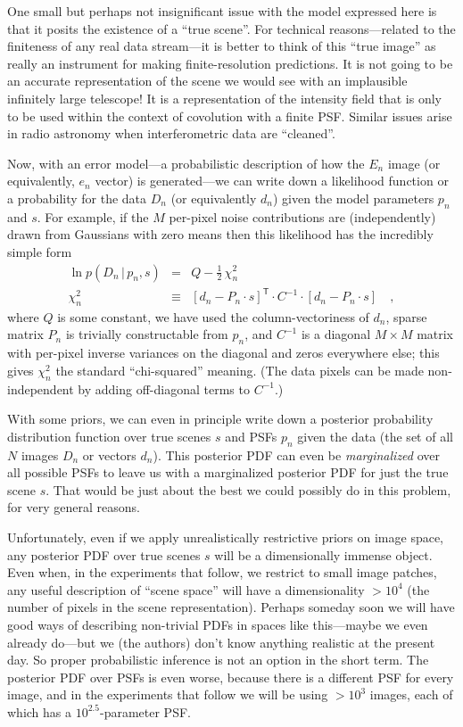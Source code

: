 \documentclass[12pt,preprint]{aastex}
\newcommand{\given}{\,|\,}
\newcommand{\transpose}[1]{{#1}^{\mathsf{T}}}
\begin{document}
One small but perhaps not insignificant issue with the model expressed
here is that it posits the existence of a ``true scene''.  For
technical reasons---related to the finiteness of any real data
stream---it is better to think of this ``true image'' as really an
instrument for making finite-resolution predictions.  It is not going
to be an accurate representation of the scene we would see with an
implausible infinitely large telescope!  It is a representation of the
intensity field that is only to be used within the context of
covolution with a finite PSF.  Similar issues arise in radio astronomy
when interferometric data are ``cleaned''.

Now, with an error model---a probabilistic description of how the
$E_n$ image (or equivalently, $e_n$ vector) is generated---we can
write down a likelihood function or a probability for the data $D_n$
(or equivalently $d_n$) given the model parameters $p_n$ and $s$.  For
example, if the $M$ per-pixel noise contributions are (independently)
drawn from Gaussians with zero means then this likelihood has the
incredibly simple form
\begin{eqnarray}\displaystyle
\ln p(D_n\given p_n, s) &=& Q - \frac{1}{2}\,\chi^2_n
\\
\chi^2_n &\equiv& \transpose{[d_n - P_n \cdot s]} \cdot C^{-1} \cdot [d_n - P_n \cdot s]
\quad ,
\end{eqnarray}
where $Q$ is some constant, we have used the column-vectoriness of
$d_n$, sparse matrix $P_n$ is trivially constructable from $p_n$, and
$C^{-1}$ is a diagonal $M\times M$ matrix with per-pixel inverse
variances on the diagonal and zeros everywhere else; this gives
$\chi^2_n$ the standard ``chi-squared'' meaning.  (The data pixels can
be made non-independent by adding off-diagonal terms to $C^{-1}$.)

With some priors, we can even in principle write down a posterior
probability distribution function over true scenes $s$ and PSFs $p_n$
given the data (the set of all $N$ images $D_n$ or vectors $d_n$).
This posterior PDF can even be \emph{marginalized} over all possible
PSFs to leave us with a marginalized posterior PDF for just the true
scene $s$.  That would be just about the best we could possibly do in
this problem, for very general reasons.

Unfortunately, even if we apply unrealistically restrictive priors on
image space, any posterior PDF over true scenes $s$ will be a
dimensionally immense object.  Even when, in the experiments that
follow, we restrict to small image patches, any useful description of
``scene space'' will have a dimensionality $>10^4$ (the number of
pixels in the scene representation).  Perhaps someday soon we will
have good ways of describing non-trivial PDFs in spaces like
this---maybe we even already do---but we (the authors) don't know
anything realistic at the present day.  So proper probabilistic
inference is not an option in the short term.  The posterior PDF over
PSFs is even worse, because there is a different PSF for every image,
and in the experiments that follow we will be using $>10^3$ images,
each of which has a $10^{2.5}$-parameter PSF.
\end{document}
